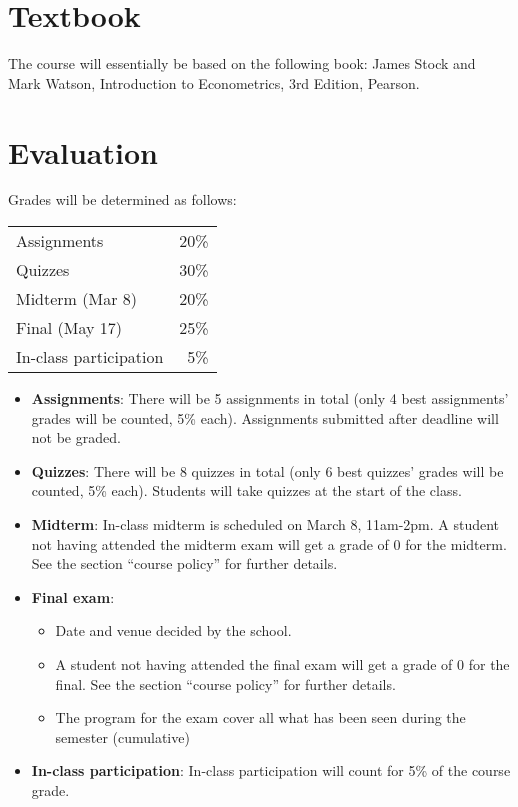 \documentclass[12]{article}
\begin{document}
\section*{Textbook}
The course will essentially be based on the following book: James Stock and Mark Watson, Introduction to Econometrics, 3rd Edition, Pearson.

\section*{Evaluation}

Grades will be determined as follows:
\begin{table}[!h] \centering 
	\label{tab:grades} 
	\begin{tabularx}{0.5\textwidth}{Xr} 
		\toprule
		Assignments         & 20\%  \\
		Quizzes             & 30\% \\
		Midterm	(Mar 8)            & 20\% \\
		Final (May 17)              & 25\% \\
		In-class participation						& 5\% \\
		\bottomrule
	\end{tabularx} 
\end{table} 

\begin{itemize}
    \item \textbf{Assignments}: There will be 5 assignments in total (only 4 best assignments' grades will be counted, 5\% each). Assignments submitted after deadline will not be graded. 
    \item \textbf{Quizzes}: There will be 8 quizzes in total (only 6 best quizzes' grades will be counted, 5\% each). Students will take quizzes at the start of the class.
    \item \textbf{Midterm}: In-class midterm is scheduled on March 8, 11am-2pm. A student not having attended the midterm exam will get a grade of 0 for the midterm. See the section ``course policy'' for further details.
    \item \textbf{Final exam}:
    \begin{itemize}
    \item Date and venue decided by the school. 
    \item A student not having attended the final exam will get a
    grade of 0 for the final.  See the
    section ``course policy'' for further details.
    \item The program for the exam cover all what has been seen during
    the semester (cumulative)
    \end{itemize}
    \item \textbf{In-class participation}: In-class participation will count for 5\% of the course grade.
\end{itemize}
\end{document}
